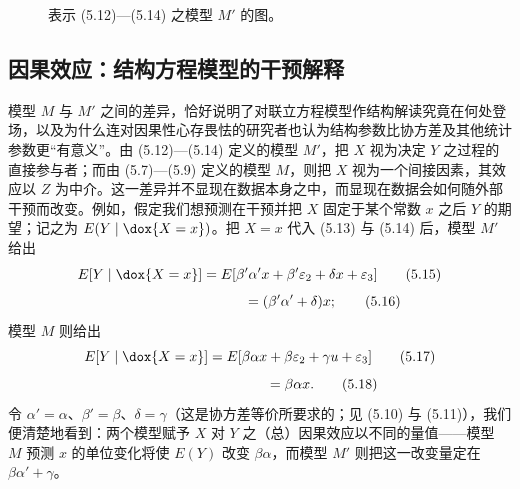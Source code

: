 \begin{figure}[htbp]
\centering
{}
\caption{表示 \textup{(5.12)}—\textup{(5.14)} 之模型 $M'$ 的图。}
\label{fig:5.13}
\end{figure}

\subsection{因果效应：结构方程模型的干预解释}

模型 $M$ 与 $M'$ 之间的差异，恰好说明了对联立方程模型作结构解读究竟在何处登场，以及为什么连对因果性心存畏怯的研究者也认为结构参数比协方差及其他统计参数更“有意义”。由 \textup{(5.12)}—\textup{(5.14)} 定义的模型 $M'$，把 $X$ 视为决定 $Y$ 之过程的直接参与者；而由 \textup{(5.7)}—\textup{(5.9)} 定义的模型 $M$，则把 $X$ 视为一个间接因素，其效应以 $Z$ 为中介。这一差异并不显现在数据本身之中，而显现在数据会如何随外部干预而改变。例如，假定我们想预测在干预并把 $X$ 固定于某个常数 $x$ 之后 $Y$ 的期望；记之为 $E(Y\mid \dox{X=x})$。把 $X=x$ 代入 \textup{(5.13)} 与 \textup{(5.14)} 后，模型 $M'$ 给出
\begin{equation}
E[Y\mid \dox{X=x}]=E[\beta'\alpha'x+\beta'\varepsilon_2+\delta x+\varepsilon_3] \tag{5.15}
\end{equation}
\begin{equation}
\phantom{E[Y\mid \dox{X=x}]}=(\beta'\alpha'+\delta)x; \tag{5.16}
\end{equation}
模型 $M$ 则给出
\begin{equation}
E[Y\mid \dox{X=x}]=E[\beta\alpha x+\beta\varepsilon_2+\gamma u+\varepsilon_3] \tag{5.17}
\end{equation}
\begin{equation}
\phantom{E[Y\mid \dox{X=x}]}=\beta\alpha x. \tag{5.18}
\end{equation}
令 $\alpha'=\alpha$、$\beta'=\beta$、$\delta=\gamma$（这是协方差等价所要求的；见 \textup{(5.10)} 与 \textup{(5.11)}），我们便清楚地看到：两个模型赋予 $X$ 对 $Y$ 之（总）因果效应以不同的量值——模型 $M$ 预测 $x$ 的单位变化将使 $E(Y)$ 改变 $\beta\alpha$，而模型 $M'$ 则把这一改变量定在 $\beta\alpha'+\gamma$。

